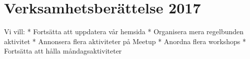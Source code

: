 \documentclass[a4paper,11pt,oneside]{article}
\begin{document}
\section{Verksamhetsberättelse 2017}

Vi vill:
* Fortsätta att uppdatera vår hemsida
* Organisera mera regelbunden aktivitet
* Annonsera flera aktiviteter på Meetup
* Anordna flera workshops
* Fortsätta att hålla måndagsaktiviteter
\end{document}
